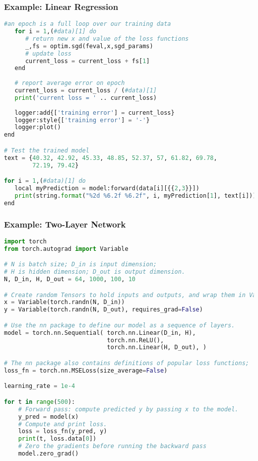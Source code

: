 \begin{frame}[fragile]
\MyLogo
\frametitle{Example: Linear Regression}  
\ContinueLineNumber
\scriptsize{
\begin{lstlisting}[language=python]
   #an epoch is a full loop over our training data
   for i = 1,(#data)[1] do
      # return new x and value of the loss functions
      _,fs = optim.sgd(feval,x,sgd_params)
      # update loss       
      current_loss = current_loss + fs[1]
   end      
   
   # report average error on epoch
   current_loss = current_loss / (#data)[1]
   print('current loss = ' .. current_loss)
   
   logger:add{['training error'] = current_loss}
   logger:style{['training error'] = '-'}
   logger:plot()  
end

# Test the trained model
text = {40.32, 42.92, 45.33, 48.85, 52.37, 57, 61.82, 69.78, 
        72.19, 79.42}

for i = 1,(#data)[1] do
   local myPrediction = model:forward(data[i][{{2,3}}])
   print(string.format("%2d %6.2f %6.2f", i, myPrediction[1], text[i]))
end
\end{lstlisting}
}
\end{frame}

\begin{frame}[fragile]
\MyLogo
\frametitle{Example: Two-Layer Network}  
\scriptsize{
\begin{lstlisting}[language=python]
import torch
from torch.autograd import Variable

# N is batch size; D_in is input dimension;
# H is hidden dimension; D_out is output dimension.
N, D_in, H, D_out = 64, 1000, 100, 10

# Create random Tensors to hold inputs and outputs, and wrap them in Variables.
x = Variable(torch.randn(N, D_in))
y = Variable(torch.randn(N, D_out), requires_grad=False)

# Use the nn package to define our model as a sequence of layers.
model = torch.nn.Sequential( torch.nn.Linear(D_in, H),
                             torch.nn.ReLU(),
                             torch.nn.Linear(H, D_out), )

# The nn package also contains definitions of popular loss functions;
loss_fn = torch.nn.MSELoss(size_average=False)

learning_rate = 1e-4

for t in range(500):
	# Forward pass: compute predicted y by passing x to the model.
	y_pred = model(x)
	# Compute and print loss.
	loss = loss_fn(y_pred, y)
	print(t, loss.data[0])
	# Zero the gradients before running the backward pass
	model.zero_grad()
\end{lstlisting}
}
\end{frame}

